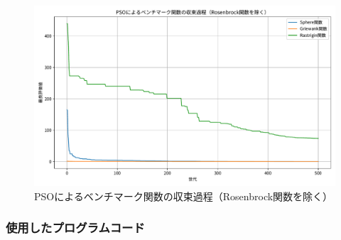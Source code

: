 \begin{figure}[H]
    \centering
    \includegraphics[width=0.8\linewidth]{figure/Figure_1.pdf}
    \caption{PSOによるベンチマーク関数の収束過程（Rosenbrock関数を除く）}
    \label{fig:convergence2}
\end{figure}


\newpage
\subsubsection{使用したプログラムコード}

